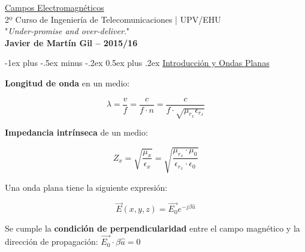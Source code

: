 \documentclass[10pt,landscape]{article}
\makeatletter
\renewcommand{\section}{\@startsection{section}{1}{0mm}%
                                {-1ex plus -.5ex minus -.2ex}%
                                {0.5ex plus .2ex}%
                                {\normalfont\large\bfseries}}
\makeatother
\begin{document}
\raggedright
\footnotesize
\begin{multicols}{3}


\setlength{\premulticols}{1pt}
\setlength{\postmulticols}{1pt}
\setlength{\multicolsep}{1pt}
\setlength{\columnsep}{2pt}

\begin{framed}
	\begin{center}
    	\Large{\underline{Campos Electromagnéticos}} \\
    	\scriptsize{2º Curso de Ingeniería de Telecomunicaciones | UPV/EHU}\\
     	"\textsl{Under-promise and over-deliver}." \\
     	\small{\textbf{Javier de Martín Gil -- 2015/16}}
	\end{center}
\end{framed}

\section{\underline{Introducción y Ondas Planas}}

\textbf{Longitud de onda} en un medio:

\begin{equation*}
	\lambda = \frac{v}{f} = \frac{c}{f \cdot n} = \frac{c}{f \cdot \sqrt{{\mu_{r_x}} \epsilon_{r_x}}} 
\end{equation*}

\textbf{Impedancia intrínseca} de un medio:

\begin{equation*}
	Z_x = \sqrt{\frac{\mu_x}{\epsilon_x}} = \sqrt{\frac{\mu_{r_x} \cdot \mu_0}{\epsilon_{r_x} \cdot \epsilon_0}}		
\end{equation*}

Una onda plana tiene la siguiente expresión:

\begin{equation*}
	\vec{E}(x, y, z) = \vec{E_0} e^{-j \beta \hat{u}}
\end{equation*}

Se cumple la \textbf{condición de perpendicularidad} entre el campo magnético y la dirección de propagación: $\vec{E_0} \cdot \beta \hat{u} = 0$ \\


\end{multicols}
\end{document}
